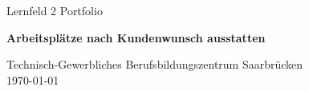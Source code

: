 \begin{titlepage}
    \begin{center}
        \vspace*{1cm}
        \LARGE
        Lernfeld 2 Portfolio

        \vspace{0.5cm}
        \Huge
        \textbf{Arbeitsplätze nach Kundenwunsch ausstatten}

        \vspace{1.5cm}
        \large

        \vspace*{\fill}
        Technisch-Gewerbliches Berufsbildungszentrum Saarbrücken \\
        \today
    \end{center}  
\end{titlepage}